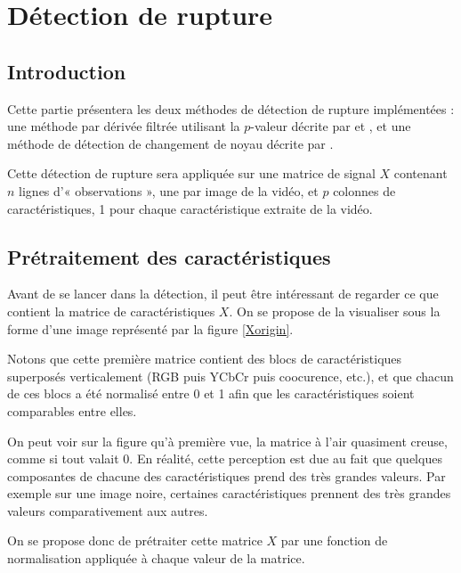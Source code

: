 \chapter{Détection de rupture}

\section{Introduction}

Cette partie présentera les deux méthodes de détection de rupture implémentées : une méthode par dérivée filtrée utilisant la $p$-valeur décrite par \cite{Bertrand11} et \cite{Herault14}, et une méthode de détection de changement de noyau décrite par \cite{Desobry05}.

Cette détection de rupture sera appliquée sur une matrice de signal $X$ contenant $n$ lignes d'« observations », une par image de la vidéo, et $p$ colonnes de caractéristiques, 1 pour chaque caractéristique extraite de la vidéo.


\section{Prétraitement des caractéristiques}

Avant de se lancer dans la détection, il peut être intéressant de regarder ce que contient la matrice de caractéristiques $X$. On se propose de la visualiser sous la forme d'une image représenté par la figure \ref{Xorigin}.

Notons que cette première matrice contient des blocs de caractéristiques superposés verticalement (RGB puis YCbCr puis coocurence, etc.), et que chacun de ces blocs a été normalisé entre 0 et 1 afin que les caractéristiques soient comparables entre elles.

On peut voir sur la figure qu'à première vue, la matrice à l'air quasiment creuse, comme si tout valait $0$. En réalité, cette perception est due au fait que quelques composantes de chacune des caractéristiques prend des très grandes valeurs. Par exemple sur une image noire, certaines caractéristiques prennent des très grandes valeurs comparativement aux autres.

On se propose donc de prétraiter cette matrice $X$ par une fonction de normalisation appliquée à chaque valeur de la matrice. 


